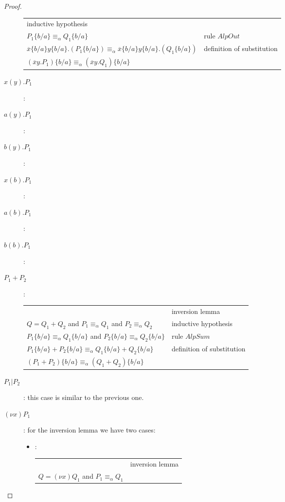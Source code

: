\begin{proof}
\begin{description}
\begin{center}
\begin{tabular}{ll}
		inductive hypothesis
	    \\
		$P_{1}\{b/a\}\equiv_{\alpha} Q_{1}\{b/a\}$
	      &
		rule $AlpOut$
	    \\
		$\overline{x}\{b/a\}y\{b/a\}.(P_{1}\{b/a\})\equiv_{\alpha} \overline{x}\{b/a\}y\{b/a\}.(Q_{1}\{b/a\})$
	      &
		definition of substitution
	    \\
		$(\overline{x}y.P_{1})\{b/a\}\equiv_{\alpha} (\overline{x}y.Q_{1})\{b/a\}$
	      &
	    \\
	  \end{tabular}
	\end{center}
      \item[$x(y).P_{1}$]:
      \item[$a(y).P_{1}$]:
      \item[$b(y).P_{1}$]:
      \item[$x(b).P_{1}$]:
      \item[$a(b).P_{1}$]:
      \item[$b(b).P_{1}$]:
      \item[$P_{1}+P_{2}$]:
	\begin{center}
	  \begin{tabular}{ll}
	      &
		inversion lemma 
	    \\
		$Q=Q_{1}+Q_{2}$ and $P_{1}\equiv_{\alpha} Q_{1}$ and $P_{2}\equiv_{\alpha} Q_{2}$
	      &
		inductive hypothesis
	    \\
		$P_{1}\{b/a\}\equiv_{\alpha} Q_{1}\{b/a\}$ and $P_{2}\{b/a\}\equiv_{\alpha} Q_{2}\{b/a\}$
	      &
		rule $AlpSum$
	    \\
		$P_{1}\{b/a\} + P_{2}\{b/a\}\equiv_{\alpha} Q_{1}\{b/a\} + Q_{2}\{b/a\}$
	      &
		definition of substitution
	    \\
		$(P_{1} + P_{2})\{b/a\}\equiv_{\alpha} (Q_{1} + Q_{2})\{b/a\}$
	      &
	    \\
	  \end{tabular}
	\end{center}	
      \item[$P_{1}|P_{2}$]:
	this case is similar to the previous one.
      \item[$(\nu x)P_{1}$]:
	for the inversion lemma we have two cases:
	\begin{itemize}
	  \item:
	    \begin{center}
	      \begin{tabular}{ll}
		  &
		    inversion lemma 
		\\
		    $Q=(\nu x) Q_{1}$ and $P_{1}\equiv_{\alpha}Q_{1}$ 

\end{tabular}
\end{center}
\end{itemize}
\end{description}
\end{proof}
